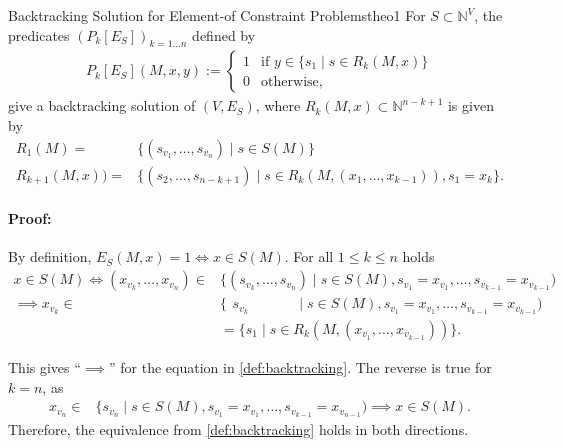 \begin{theorem}{Backtracking Solution for Element-of Constraint Problems}{theo1}
    For $S\subset\mathbb N^V$, the predicates $(P_k[E_S])_{k=1\dots n}$
    defined by
    \begin{align*}
        P_k[E_S](M,x,y):=\left\{
            \begin{array}{ll}
                1&\text{if }y\in \{s_1\mid s\in R_k(M,x)\}\\[-0.15em]
                0&\text{otherwise},
            \end{array}\right.
    \end{align*}
    give a backtracking solution of $(V,E_S)$, where
    $R_k(M,x)\subset\mathbb N^{n-k+1}$ is given by
    \begin{align*}
        R_1(M)={}&\{(s_{v_1},\dots,s_{v_n})\mid s\in S(M)\}\\[-0.15em]
        R_{k+1}(M,x))={}&\{(s_2,\dots,s_{n-k+1})\mid s\in R_k(M,(x_1,\dots,x_{k-1})), s_1=x_k\}.
    \end{align*}
    \tcblower
    \paragraph*{Proof:} By definition, $E_S(M,x)=1\iff x\in S(M)$.
    For all $1\leq k\leq n$ holds
    \begin{align*}
        x\in S(M)\iff(x_{v_k},\dots,x_{v_n})\in{}&\{(s_{v_k},\dots,s_{v_n})\mid s\in S(M),s_{v_1}=x_{v_1},\dots,s_{v_{k-1}}=x_{v_{k-1}})\\[-0.15em]
                            \implies x_{v_k}\in{}&\{\phantom{(}s_{v_k}\phantom{,\dots,s_{v_n})}\mid s\in S(M),s_{v_1}=x_{v_1},\dots,s_{v_{k-1}}=x_{v_{k-1}})\\[-0.15em]
                                                 &=\{s_1\mid s\in R_k(M,(x_{v_1},\dots,x_{v_{k-1}}))\}.
    \end{align*}

    This gives ``$\implies$'' for the equation in \autoref{def:backtracking}.
    The reverse is true for $k=n$, as
    \begin{align*}
        x_{v_n}\in{}&\{s_{v_n}\mid s\in S(M),s_{v_1}=x_{v_1},\dots,s_{v_{k-1}}=x_{v_{n-1}})\implies x\in S(M).
    \end{align*}
    Therefore, the equivalence from \autoref{def:backtracking} holds in both directions.
\end{theorem}
